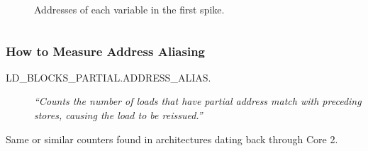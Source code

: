 \documentclass{beamer}
\begin{document}
\begin{frame}
\begin{columns}[T]
\begin{column}{.50\textwidth}
\begin{figure}
\begin{tikzpicture}[font=\footnotesize]

  \end{tikzpicture}
  \caption{Addresses of each variable in the first spike.}
\end{figure}


\end{column}
\end{columns}

\end{frame}


\begin{frame}[fragile]
  \frametitle{How to Measure Address Aliasing}

  \begin{description}
    \item[{\small LD\_BLOCKS\_PARTIAL.ADDRESS\_ALIAS.}] 
    \emph{``Counts the number of loads that have partial address match with preceding stores, causing the load to be reissued.''} 
    \cite[B.3.4.4]{OptimizationManual}
  \end{description}

  Same or similar counters found in architectures dating back through Core 2.



\end{frame}
\end{document}
